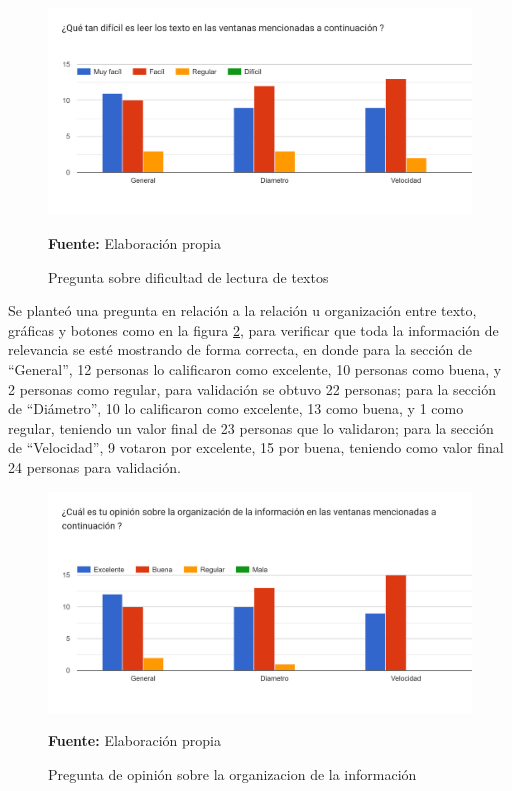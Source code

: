 \documentclass[12pt,twocolumn,a4paper]{article}
\begin{document}
\begin{figure}[h!]
	\centering
	\includegraphics[scale=0.2]{Encuesta7.png}
	\caption{Pregunta sobre dificultad de lectura de textos} \textbf{Fuente:} Elaboración propia
	\label{Encuesta7}
\end{figure} 

Se planteó una pregunta en relación a la relación u organización entre texto, gráficas y botones como en la figura \ref{Encuesta8}, para verificar que toda la información de relevancia se esté mostrando de forma correcta, en donde para la sección de “General”, 12 personas lo calificaron como excelente, 10 personas como buena, y 2 personas como regular, para validación se obtuvo 22 personas; para la sección de “Diámetro”, 10 lo calificaron como excelente, 13 como  buena, y 1 como regular, teniendo un valor final de 23 personas que lo validaron; para la sección de “Velocidad”, 9 votaron por excelente, 15 por  buena, teniendo como valor final 24 personas para validación. 

\begin{figure}[h!]
	\centering
	\includegraphics[scale=0.2]{Encuesta8.png}
	\caption{Pregunta de opinión sobre la organizacion de la información } \textbf{Fuente:} Elaboración propia
	\label{Encuesta8}
\end{figure}
\end{document}
